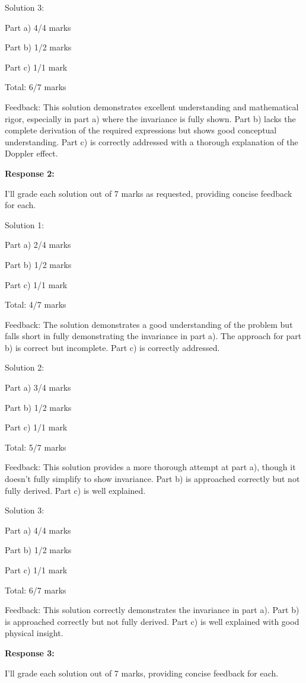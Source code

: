 \documentclass[a4paper,11pt]{article}
\begin{document}
Solution 3:

Part a) 4/4 marks

Part b) 1/2 marks

Part c) 1/1 mark

Total: 6/7 marks

Feedback: This solution demonstrates excellent understanding and mathematical rigor, especially in part a) where the invariance is fully shown. Part b) lacks the complete derivation of the required expressions but shows good conceptual understanding. Part c) is correctly addressed with a thorough explanation of the Doppler effect.

\bigskip
\textbf{Response 2:}

I'll grade each solution out of 7 marks as requested, providing concise feedback for each.

Solution 1:

Part a) 2/4 marks

Part b) 1/2 marks

Part c) 1/1 mark

Total: 4/7 marks

Feedback: The solution demonstrates a good understanding of the problem but falls short in fully demonstrating the invariance in part a). The approach for part b) is correct but incomplete. Part c) is correctly addressed.

Solution 2:

Part a) 3/4 marks

Part b) 1/2 marks

Part c) 1/1 mark

Total: 5/7 marks

Feedback: This solution provides a more thorough attempt at part a), though it doesn't fully simplify to show invariance. Part b) is approached correctly but not fully derived. Part c) is well explained.

Solution 3:

Part a) 4/4 marks

Part b) 1/2 marks

Part c) 1/1 mark

Total: 6/7 marks

Feedback: This solution correctly demonstrates the invariance in part a). Part b) is approached correctly but not fully derived. Part c) is well explained with good physical insight.

\bigskip
\textbf{Response 3:}

I'll grade each solution out of 7 marks, providing concise feedback for each.
\end{document}
